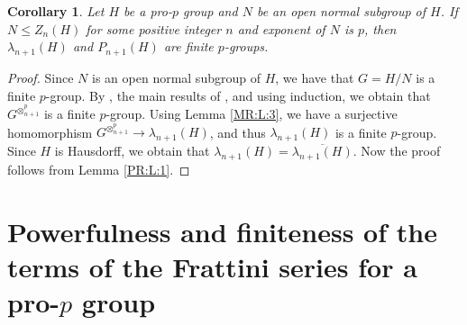 \documentclass[12pt]{elsarticle}
\newtheorem{corollary}[theorem]{Corollary}
\newtheorem*{main corollary*}{Main Corollary}
\theoremstyle{definition}
\begin{document}
\begin{corollary}\label{MR:T:1}
Let $H$ be a  pro-$p$ group and $N$ be an open normal subgroup of $H$. If $N\leqslant Z_n(H)$ for some positive integer $n$ and exponent of $N$ is $p$, then $\lambda_{n+1}(H)$ and $P_{n+1}(H)$ are finite $p$-groups.
\end{corollary}
\begin{proof}
Since $N$ is an open normal subgroup of $H$, we have that  $G=H/N$ is a finite $p$-group. By \cite[Corollary 12]{MR1088877}, the main results of \cite{E87}, and using induction, we obtain that $G^{\otimes^{p}_{n+1}}$ is a finite $p$-group. Using Lemma \ref{MR:L:3}, we have a surjective homomorphism $G^{\otimes^{p}_{n+1}}\to \lambda_{n+1}(H)$, and thus $\lambda_{n+1}(H)$ is a finite $p$-group. Since $H$ is Hausdorff, we obtain that $\lambda_{n+1}(H)= \overline{\lambda_{n+1}(H)}$. Now the proof follows from Lemma \ref{PR:L:1}.









\end{proof}


\section{Powerfulness and finiteness of the terms of the Frattini series for a pro-$p$ group} \label{frattini series}
\end{document}
